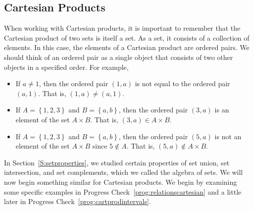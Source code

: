 \subsection*{Cartesian Products}

When working with Cartesian products, it is important to remember that the Cartesian product of two sets is itself a set.  As a set, it consists of a collection of elements.  In this case, the elements of a Cartesian product are ordered pairs.  We should think of an ordered pair as a single object that consists of two other objects in a specified order.  For example,
\begin{itemize}
\item If  $a \ne 1$, then the ordered pair  $\left( {1,a} \right)$ is not equal to the ordered pair  $\left( {a,1} \right)$.  That is,  $\left( {1,a} \right) \ne \left( {a,1} \right)$.

\item If  $A = \left\{ {1,2,3} \right\}$  and  $B = \left\{ {a,b} \right\}$, then the ordered pair  $\left( {3,a} \right)$ is an element of the set   $A \times B$.  That is,  $\left( {3,a} \right) \in A \times B$.

\item If  $A = \left\{ {1,2,3} \right\}$  and  $B = \left\{ {a,b} \right\}$, then the ordered pair  $\left( {5,a} \right)$ is not an element of the set   $A \times B$ since $5 \notin A$.  That is,  $\left( {5,a} \right) \notin A \times B$.
\end{itemize}

In Section~\ref{S:setproperties}, we studied certain properties of set union, set intersection, and set complements, which we called the algebra of sets.  We will now begin something similar for Cartesian products.  We begin by examining some specific examples in Progress Check~\ref{prog:relationscartesian} and a little later in Progress Check~\ref{prog:cartprodintervals}.
\hbreak

